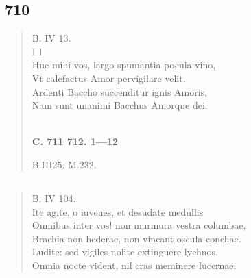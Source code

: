 \documentclass[11pt, a4paper]{report}
\begin{document}
            \subsection*{710}
      \begin{verse}
      B. IV 13. \\ I I \\ Huc mihi vos, largo spumantia pocula vino, \\ Vt calefactus Amor pervigilare velit. \\ Ardenti Baccho succenditur ignis Amoris, \\ Nam sunt unanimi Bacchus Amorque dei. \\ 
        ﻿\pagebreak 
     \marginpar{[176]} \begin{center} \textbf{C. 711 712. 1—12} \end{center}B.III25. M.232. \\ 
      \end{verse}
  
            \subsection*{}
      \begin{verse}
      B. IV 104. \\ Ite agite, o iuvenes, et desudate medullis \\ Omnibus inter vos! non murmura vestra columbae, \\ Brachia non hederae, non vincant oscula conchae. \\ Ludite: sed vigiles nolite extinguere lychnos. \\ Omnia nocte vident, nil cras meminere lucernae. \\ 
      \end{verse}
  
\end{document}
